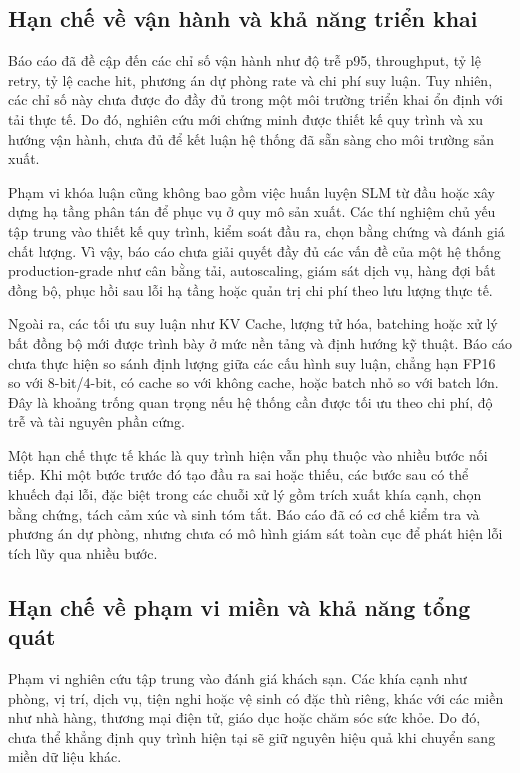 \subsection{Hạn chế về vận hành và khả năng triển khai}

Báo cáo đã đề cập đến các chỉ số vận hành như độ trễ p95, throughput, tỷ lệ retry, tỷ lệ cache hit, phương án dự phòng rate và chi phí suy luận. Tuy nhiên, các chỉ số này chưa được đo đầy đủ trong một môi trường triển khai ổn định với tải thực tế. Do đó, nghiên cứu mới chứng minh được thiết kế quy trình và xu hướng vận hành, chưa đủ để kết luận hệ thống đã sẵn sàng cho môi trường sản xuất.

Phạm vi khóa luận cũng không bao gồm việc huấn luyện SLM từ đầu hoặc xây dựng hạ tầng phân tán để phục vụ ở quy mô sản xuất. Các thí nghiệm chủ yếu tập trung vào thiết kế quy trình, kiểm soát đầu ra, chọn bằng chứng và đánh giá chất lượng. Vì vậy, báo cáo chưa giải quyết đầy đủ các vấn đề của một hệ thống production-grade như cân bằng tải, autoscaling, giám sát dịch vụ, hàng đợi bất đồng bộ, phục hồi sau lỗi hạ tầng hoặc quản trị chi phí theo lưu lượng thực tế.

Ngoài ra, các tối ưu suy luận như KV Cache, lượng tử hóa, batching hoặc xử lý bất đồng bộ mới được trình bày ở mức nền tảng và định hướng kỹ thuật. Báo cáo chưa thực hiện so sánh định lượng giữa các cấu hình suy luận, chẳng hạn FP16 so với 8-bit/4-bit, có cache so với không cache, hoặc batch nhỏ so với batch lớn. Đây là khoảng trống quan trọng nếu hệ thống cần được tối ưu theo chi phí, độ trễ và tài nguyên phần cứng.

Một hạn chế thực tế khác là quy trình hiện vẫn phụ thuộc vào nhiều bước nối tiếp. Khi một bước trước đó tạo đầu ra sai hoặc thiếu, các bước sau có thể khuếch đại lỗi, đặc biệt trong các chuỗi xử lý gồm trích xuất khía cạnh, chọn bằng chứng, tách cảm xúc và sinh tóm tắt. Báo cáo đã có cơ chế kiểm tra và phương án dự phòng, nhưng chưa có mô hình giám sát toàn cục để phát hiện lỗi tích lũy qua nhiều bước.

\subsection{Hạn chế về phạm vi miền và khả năng tổng quát}

Phạm vi nghiên cứu tập trung vào đánh giá khách sạn. Các khía cạnh như phòng, vị trí, dịch vụ, tiện nghi hoặc vệ sinh có đặc thù riêng, khác với các miền như nhà hàng, thương mại điện tử, giáo dục hoặc chăm sóc sức khỏe. Do đó, chưa thể khẳng định quy trình hiện tại sẽ giữ nguyên hiệu quả khi chuyển sang miền dữ liệu khác.

